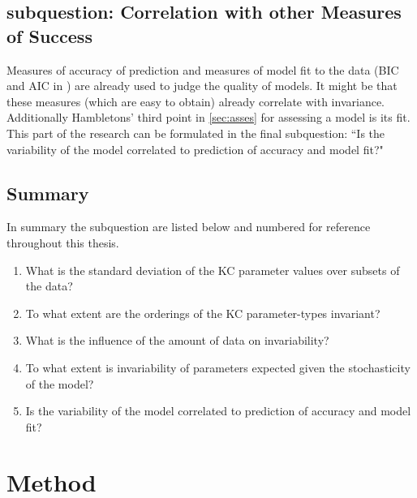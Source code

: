\documentclass{scrartcl}
\begin{document}
\subsection{subquestion: Correlation with other Measures of Success}
Measures of accuracy of prediction and measures of model fit to the data (BIC and AIC in \cite{lfa}) are already used to judge the quality of models. It might be that these measures (which are easy to obtain) already correlate with invariance. Additionally Hambletons' third point in \ref{sec:asses} for assessing a model is its fit. This part of the research can be formulated in the final subquestion: ``Is the variability of the model correlated to prediction of accuracy and model fit?"

\subsection{Summary}
In summary the subquestion are listed below and numbered for reference throughout this thesis.
\begin{enumerate}
  \item What is the standard deviation of the KC parameter values over subsets of the data?
  \item To what extent are the orderings of the KC parameter-types invariant? 
  \item What is the influence of the amount of data on invariability?
  \item To what extent is invariability of parameters expected given the stochasticity of the model?
  \item Is the variability of the model correlated to prediction of accuracy and model fit?
\end{enumerate}

\section{Method}

\end{document}
